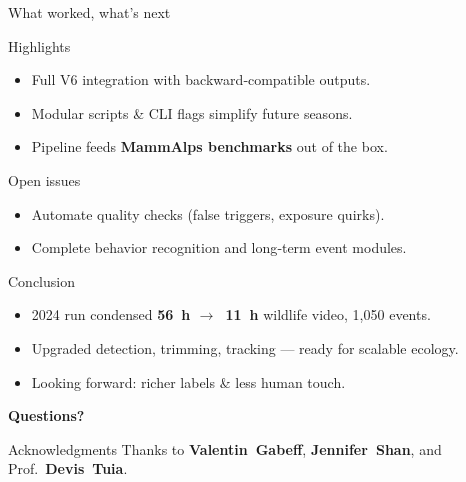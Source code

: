 \documentclass[aspectratio=169,xcolor=dvipsnames,t]{beamer}
\begin{document}
\begin{frame}{What worked, what’s next}
  \begin{block}{Highlights}
    \begin{itemize}
      \item Full V6 integration with backward‑compatible outputs.
      \item Modular scripts \& CLI flags simplify future seasons.
      \item Pipeline feeds \textbf{MammAlps benchmarks} out of the box.
    \end{itemize}
  \end{block}
  \begin{block}{Open issues}
    \begin{itemize}
      \item Automate quality checks (false triggers, exposure quirks).
      \item Complete behavior recognition and long‑term event modules.
    \end{itemize}
  \end{block}
\end{frame}

\begin{frame}{Conclusion}
  \begin{itemize}
    \item 2024 run condensed \textbf{56 h $\rightarrow$ 11 h} wildlife video, 1,050 events.
    \item Upgraded detection, trimming, tracking — ready for scalable ecology.
    \item Looking forward: richer labels \& less human touch.
  \end{itemize}
  \bigskip
  \centering
  \Large\textbf{Questions?}
\end{frame}

\begin{frame}{Acknowledgments}
  Thanks to \textbf{Valentin Gabeff}, \textbf{Jennifer Shan}, and Prof.~\textbf{Devis Tuia}.
\end{frame}

\makefinalpage
\end{document}
